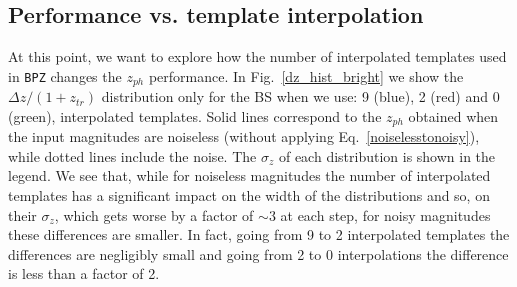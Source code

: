 \subsection{Performance vs. template interpolation}
At this point, we want to explore how the number of interpolated templates used in \texttt{BPZ} changes the $z_{ph}$ performance. In Fig.~\ref{dz_hist_bright} we show the $\Delta z / (1+z_{tr})$ distribution only for the BS when we use: 9 (blue), 2 (red) and 0 (green), interpolated templates. Solid lines correspond to the $z_{ph}$ obtained when the input magnitudes are noiseless (without applying Eq.~\ref{noiselesstonoisy}), while dotted lines include the noise. The $\sigma_z$ of each distribution is shown in the legend. We see that, while for noiseless magnitudes the number of interpolated templates has a significant impact on the width of the distributions and so, on their $\sigma_z$, which gets worse by a factor of $\sim3$ at each step, for noisy magnitudes these differences are smaller. In fact, going from 9 to 2 interpolated templates the differences are negligibly small and going from 2 to 0 interpolations the difference is less than a factor of 2. 
